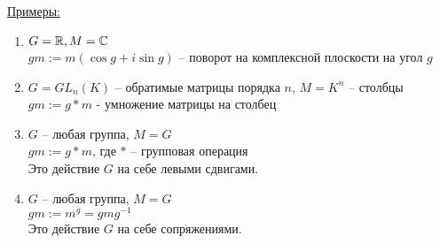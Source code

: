 \underline{Примеры:}
\begin{enumerate}
    \item $G = \mathbb{R}, M = \mathbb{C}$ \\ $gm := m(\cos g + i\sin g)$ -- поворот на комплексной плоскости на угол $g$
    \item $G = GL_n(K)$ -- обратимые матрицы порядка $n$, $M = K^n$ -- столбцы \\ $gm := g * m$ - умножение матрицы на столбец
    \item $G$ -- любая группа, $M = G$ \\ $gm := g * m$, где $*$ -- групповая операция \\ Это действие $G$ на себе левыми сдвигами.
    \item $G$ -- любая группа, $M = G$ \\ $gm := m^g = gmg^{-1}$ \\ Это действие $G$ на себе сопряжениями.
\end{enumerate}